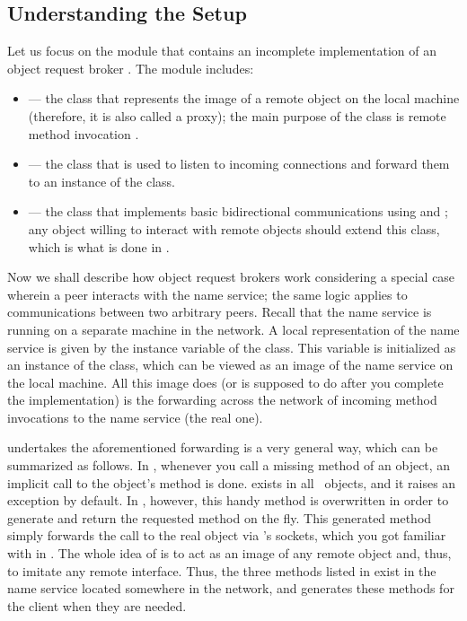 \documentclass[a4paper]{article}
\begin{document}
\subsection{Understanding the Setup}
Let us focus on the module  that contains an incomplete
implementation of an object request broker \cite{lecture4}. The module includes:
\begin{itemize}

  \item {} --- the class that represents the image of a remote
  object on the local machine (therefore, it is also called a proxy); the main
  purpose of the class is remote method invocation \cite{lecture3}.

  \item {} --- the class that is used to listen to incoming
  connections and forward them to an instance of the  class.

  \item {} --- the class that implements basic bidirectional
  communications using  and ; any object
  willing to interact with remote objects should extend this class, which is
  what is done in .

\end{itemize}

Now we shall describe how object request brokers work considering a special case
wherein a peer interacts with the name service; the same logic applies to
communications between two arbitrary peers. Recall that the name service is
running on a separate machine in the network. A local representation of the name
service is given by the  instance variable of the
 class. This variable is initialized as an instance of the
 class, which can be viewed as an image of the name service on
the local machine. All this image does (or is supposed to do after you complete
the implementation) is the forwarding across the network of incoming method
invocations to the name service (the real one).

 undertakes the aforementioned forwarding is a very general way,
which can be summarized as follows. In \python, whenever you call a missing
method of an object, an implicit call to the object's 
method \cite{python-getattr} is done.  exists in all
\python\ objects, and it raises an exception by default. In ,
however, this handy method is overwritten in order to generate and return the
requested method on the fly. This generated method simply forwards the call to
the real object via \python's sockets, which you got familiar with in .
The whole idea of  is to act as an image of any remote object
and, thus, to imitate any remote interface. Thus, the three methods listed in
 exist in the name service located somewhere in the network, and
 generates these methods for the client when they are needed.
\end{document}
